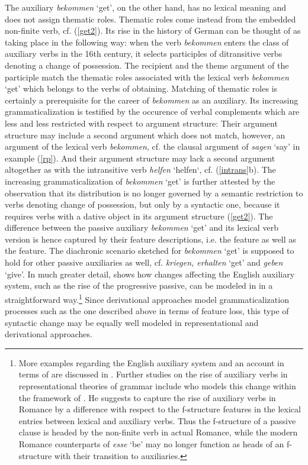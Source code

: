 \documentclass[output=paper
                ,modfonts
                ,nonflat
	        ,collection
	        ,collectionchapter
	        ,collectiontoclongg
 	        ,biblatex
                ,babelshorthands
                ,newtxmath
                ,draftmode
                ,colorlinks, citecolor=brown
]{./langsci/langscibook}
\begin{document}
The auxiliary \textit{bekommen} `get', on the other hand, has no lexical meaning and does not assign thematic roles. Thematic roles come instead from the embedded non-finite verb, cf. (\ref{get2}). Its rise in the history of German can be thought of as taking place in the following way: when the verb \textit{bekommen} enters the class of auxiliary verbs in the 16th century, it selects participles of ditransitive verbs denoting a change of possession. The recipient and the theme argument of the participle match the thematic roles associated with the lexical verb \textit{bekommen} `get' which belongs to the verbs of obtaining. Matching of thematic roles is certainly a prerequisite for the career of \textit{bekommen} as an auxiliary. Its increasing grammaticalization is testified by the occurence of verbal complements which are less and less restricted with respect to argument structure: Their argument structure may include a second argument which does not match, however, an argument of the lexical verb \textit{bekommen}, cf. the clausal argument of \textit{sagen} `say' in example (\ref{rp}). And their argument structure may lack a second argument altogether as with the intransitive verb \textit{helfen} `helfen`, cf. (\ref{intrans}b). The increasing grammaticalization of \textit{bekommen} `get' is further attested by the observation that its distribution is no longer governed by a semantic restriction to verbs denoting change of possession, but only by a syntactic one, because it requires verbs with a dative object in its argument structure (\ref{get2}). The difference between the passive auxiliary \textit{bekommen} `get' and its lexical verb version is hence captured by their feature descriptions, i.e. the \cat feature as well as the \content feature. The diachronic scenario sketched for \textit{bekommen} `get' is supposed to hold for other passive auxiliaries as well, cf. \textit{kriegen, erhalten} `get' and \textit{geben} `give'. In much greater detail, \cite{warner1995} shows how changes affecting the English auxiliary system, such as the rise of the progressive passive, can be modeled in \hpsg in a straightforward way.\footnote{More examples regarding the English auxiliary system and an account in terms of \hpsg are discussed in \cite{warner1993}. Further studies on the rise of auxiliary verbs in representational theories of grammar include \cite{schwarze2001} who models this change within the framework of \lfg. He suggests to capture the rise of auxiliary verbs in Romance by a difference with respect to the f-structure features in the lexical entries between lexical and auxiliary verbs. Thus the f-structure of a passive clause is headed by the non-finite verb in actual Romance, while the modern Romance counterparts of  \textit{esse} `be' may no longer function as heads of an f-structure with their transition to auxiliaries.} Since derivational approaches model grammaticalization processes such as the one described above in terms of feature loss, this type of syntactic change may be equally well modeled in representational and derivational approaches.
\end{document}
